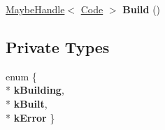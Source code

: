 \begin{DoxyCompactItemize}
\item 
\hyperlink{classv8_1_1internal_1_1_maybe_handle}{Maybe\+Handle}$<$ \hyperlink{classv8_1_1internal_1_1_code}{Code} $>$ {\bfseries Build} ()\hypertarget{classv8_1_1internal_1_1_fast_accessor_assembler_a7bfb8b99ad3bcf4f82d47062d64c23d7}{}\label{classv8_1_1internal_1_1_fast_accessor_assembler_a7bfb8b99ad3bcf4f82d47062d64c23d7}

\end{DoxyCompactItemize}
\subsection*{Private Types}
\begin{DoxyCompactItemize}
\item 
enum \{ \\*
{\bfseries k\+Building}, 
\\*
{\bfseries k\+Built}, 
\\*
{\bfseries k\+Error}
 \}\hypertarget{classv8_1_1internal_1_1_fast_accessor_assembler_a744123e61c2e932bb181e3e6f74a5ce3}{}\label{classv8_1_1internal_1_1_fast_accessor_assembler_a744123e61c2e932bb181e3e6f74a5ce3}

\end{DoxyCompactItemize}
